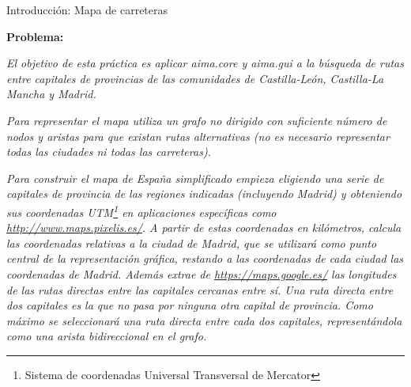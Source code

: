 \documentclass[11pt, a4paper, spanish, openright, twoside]{book}
\begin{document}
\begin{section}{Introducción: Mapa de carreteras}

	\textbf{Problema:} 
	
	\textit{El objetivo de esta práctica es aplicar aima.core y aima.gui a la búsqueda de rutas entre capitales de provincias de las comunidades de Castilla-León, Castilla-La Mancha y Madrid. }
	
	\textit{Para representar el mapa utiliza un grafo no dirigido con suficiente número de nodos y aristas para que existan rutas alternativas (no es necesario representar todas las ciudades ni todas las carreteras). }
	
	\textit{Para construir el mapa de España simplificado empieza eligiendo una serie de capitales de provincia de las regiones indicadas (incluyendo Madrid) y obteniendo sus coordenadas UTM\footnote{Sistema de coordenadas Universal Transversal de Mercator} en aplicaciones específicas como \url{http://www.maps.pixelis.es/}. A partir de estas coordenadas en kilómetros, calcula las coordenadas relativas a la ciudad de Madrid, que se utilizará como punto central de la representación gráfica, restando a las coordenadas de cada ciudad las coordenadas de Madrid. Además extrae de \url{https://maps.google.es/} las longitudes de las rutas directas entre las capitales cercanas entre sí. Una ruta directa entre dos capitales es la que no pasa por ninguna otra capital de provincia. Como máximo se seleccionará una ruta directa entre cada dos capitales, representándola como una arista bidireccional en el grafo.}


\end{section}
\end{document}
